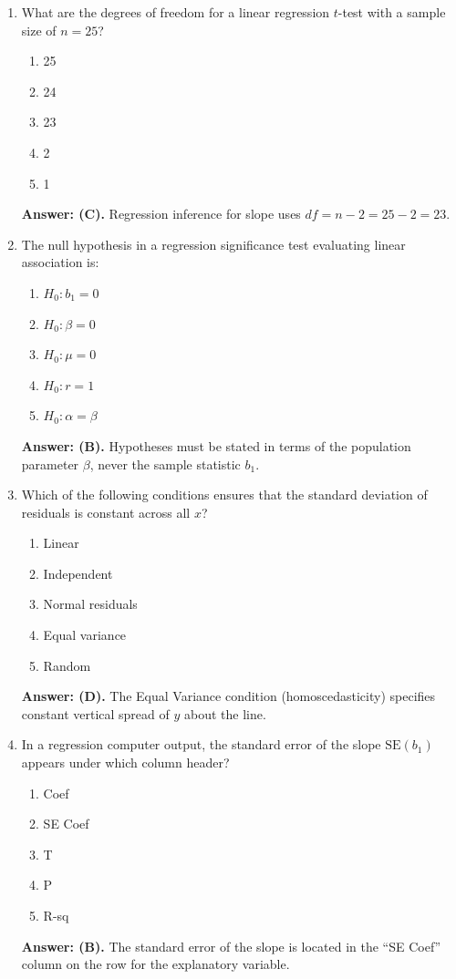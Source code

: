 \begin{enumerate}[leftmargin=1.5em]
  \item What are the degrees of freedom for a linear regression $t$-test with a sample size of $n = 25$?
  \begin{enumerate}[label=(\Alph*)]
    \item 25 \item 24 \item 23 \item 2 \item 1
  \end{enumerate}
  \textbf{Answer: (C).} Regression inference for slope uses $df = n - 2 = 25 - 2 = 23$.

  \item The null hypothesis in a regression significance test evaluating linear association is:
  \begin{enumerate}[label=(\Alph*)]
    \item $H_0: b_1 = 0$ \item $H_0: \beta = 0$ \item $H_0: \mu = 0$ \item $H_0: r = 1$ \item $H_0: \alpha = \beta$
  \end{enumerate}
  \textbf{Answer: (B).} Hypotheses must be stated in terms of the population parameter $\beta$, never the sample statistic $b_1$.

  \item Which of the following conditions ensures that the standard deviation of residuals is constant across all $x$?
  \begin{enumerate}[label=(\Alph*)]
    \item Linear \item Independent \item Normal residuals \item Equal variance \item Random
  \end{enumerate}
  \textbf{Answer: (D).} The Equal Variance condition (homoscedasticity) specifies constant vertical spread of $y$ about the line.

  \item In a regression computer output, the standard error of the slope $\text{SE}(b_1)$ appears under which column header?
  \begin{enumerate}[label=(\Alph*)]
    \item Coef \item SE Coef \item T \item P \item R-sq
  \end{enumerate}
  \textbf{Answer: (B).} The standard error of the slope is located in the ``SE Coef'' column on the row for the explanatory variable.


\end{enumerate}
